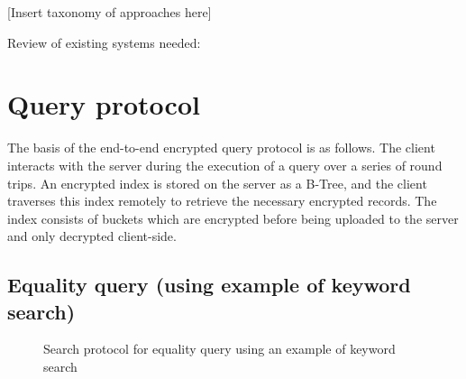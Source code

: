 \documentclass[notitlepage]{revtex4-1}
\begin{document}
[Insert taxonomy of approaches here]

Review of existing systems needed:~\cite{cipherbase}~\cite{cryptdb}~\cite{gentry}~\cite{smart}


\section{Query protocol}

The basis of the end-to-end encrypted query protocol is as follows.
The client interacts with the server during the execution of a query over a series of round trips.
An encrypted index is stored on the server as a B-Tree, and the client traverses this index remotely to retrieve the necessary encrypted records.
The index consists of buckets which are encrypted before being uploaded to the server and only decrypted client-side.

\subsection{Equality query (using example of keyword search)}
\begin{figure}
	\begin{center}
        \qquad
	\end{center}
    \caption{Search protocol for equality query using an example of keyword search}
	\label{fig:btree-protocol}
\end{figure}
\end{document}
